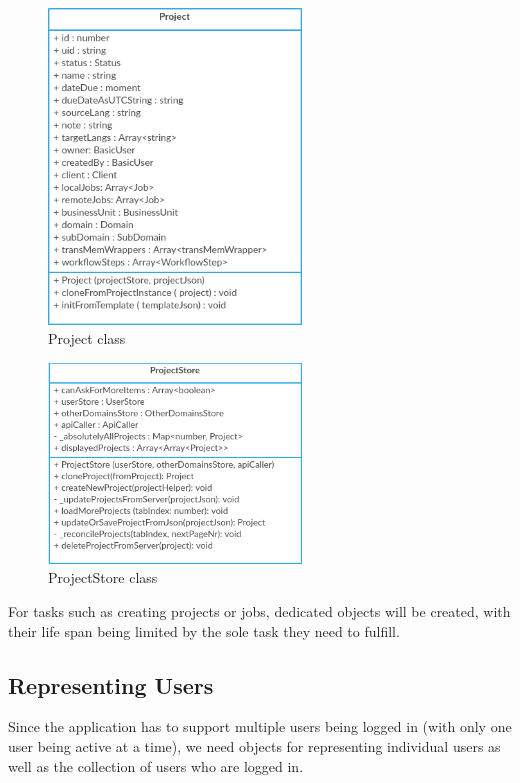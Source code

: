 \begin{figure}[H]
	\includegraphics[width=0.6\textwidth]{pics/Project}
	\caption{Project class}
	\label{Project}
\end{figure}


\begin{figure}[H]
	\includegraphics[width=0.6\textwidth]{pics/ProjectStore}
	\caption{ProjectStore class}
	\label{projectStore}
\end{figure}

For tasks such as creating projects or jobs, dedicated objects will be created, with their life span being limited by the sole task they need to fulfill.

\subsection{Representing Users}

Since the application has to support multiple users being logged in (with only one user being active at a time), we need objects for representing individual users as well as the collection of users who are logged in.

